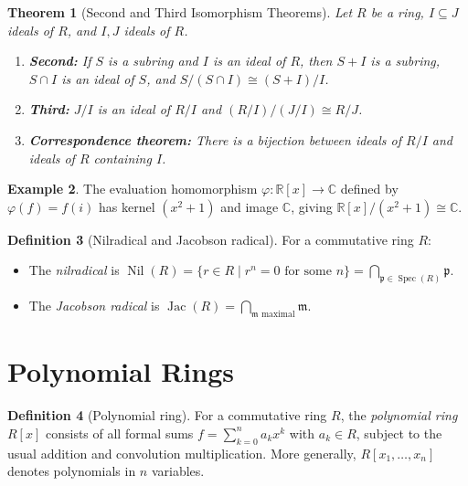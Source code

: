 \documentclass[12pt,a4paper]{amsart}
\newtheorem{theorem}{Theorem}[section]
\theoremstyle{definition}
\newtheorem{definition}[theorem]{Definition}
\newtheorem{example}[theorem]{Example}
\theoremstyle{definition}
\DeclareMathOperator{\Spec}{Spec}
\DeclareMathOperator{\Nil}{Nil}
\DeclareMathOperator{\Jac}{Jac}
\begin{document}
\begin{theorem}[Second and Third Isomorphism Theorems]
Let $R$ be a ring, $I \subseteq J$ ideals of $R$, and $I, J$ ideals of $R$.
\begin{enumerate}[label=(\roman*)]
  \item \textbf{Second:} If $S$ is a subring and $I$ is an ideal of $R$, then
        $S + I$ is a subring, $S \cap I$ is an ideal of $S$, and
        $S/(S \cap I) \cong (S+I)/I$.
  \item \textbf{Third:} $J/I$ is an ideal of $R/I$ and
        $(R/I)/(J/I) \cong R/J$.
  \item \textbf{Correspondence theorem:} There is a bijection between
        ideals of $R/I$ and ideals of $R$ containing $I$.
\end{enumerate}
\end{theorem}

\begin{example}
The evaluation homomorphism $\varphi\colon \mathbb{R}[x] \to \mathbb{C}$ defined by
$\varphi(f) = f(i)$ has kernel $(x^2 + 1)$ and image $\mathbb{C}$, giving
$\mathbb{R}[x]/(x^2+1) \cong \mathbb{C}$.
\end{example}

\begin{definition}[Nilradical and Jacobson radical]
For a commutative ring $R$:
\begin{itemize}
  \item The \emph{nilradical} is $\Nil(R) = \{r \in R \mid r^n = 0 \text{ for some } n\} = \bigcap_{\mathfrak{p} \in \Spec(R)} \mathfrak{p}$.
  \item The \emph{Jacobson radical} is $\Jac(R) = \bigcap_{\mathfrak{m} \text{ maximal}} \mathfrak{m}$.
\end{itemize}
\end{definition}

\section{Polynomial Rings}

\begin{definition}[Polynomial ring]
For a commutative ring $R$, the \emph{polynomial ring} $R[x]$ consists of all formal
sums $f = \sum_{k=0}^n a_k x^k$ with $a_k \in R$, subject to the usual addition and
convolution multiplication. More generally, $R[x_1,\ldots,x_n]$ denotes polynomials
in $n$ variables.
\end{definition}
\end{document}

